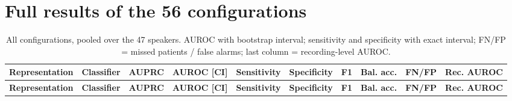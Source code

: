 \documentclass[11pt,a4paper]{article}
\begin{document}
\appendix
\section{Full results of the 56 configurations}\label{sec:app-full}
\begin{landscape}
\begin{center}\footnotesize\renewcommand{\arraystretch}{1.15}
\begin{longtable}{>{\raggedright\arraybackslash}p{3.60cm}>{\raggedright\arraybackslash}p{2.20cm}>{\raggedleft\arraybackslash}p{1.22cm}>{\raggedright\arraybackslash}p{3.30cm}>{\raggedright\arraybackslash}p{2.30cm}>{\raggedright\arraybackslash}p{2.30cm}>{\raggedleft\arraybackslash}p{1.22cm}>{\raggedleft\arraybackslash}p{1.22cm}>{\raggedleft\arraybackslash}p{1.22cm}>{\raggedleft\arraybackslash}p{1.22cm}}
\caption{All configurations, pooled over the 47 speakers. AUROC with bootstrap interval; sensitivity and specificity with exact interval; FN/FP = missed patients / false alarms; last column = recording-level AUROC.}\\
\toprule
\textbf{\hspace{0pt}Representation} & \textbf{\hspace{0pt}Classifier} & \textbf{\hspace{0pt}AUPRC} & \textbf{\hspace{0pt}AUROC [CI]} & \textbf{\hspace{0pt}Sensitivity} & \textbf{\hspace{0pt}Specificity} & \textbf{\hspace{0pt}F1} & \textbf{\hspace{0pt}Bal. acc.} & \textbf{\hspace{0pt}FN/\allowbreak{}FP} & \textbf{\hspace{0pt}Rec. AUROC}\\\midrule\endfirsthead
\toprule
\textbf{\hspace{0pt}Representation} & \textbf{\hspace{0pt}Classifier} & \textbf{\hspace{0pt}AUPRC} & \textbf{\hspace{0pt}AUROC [CI]} & \textbf{\hspace{0pt}Sensitivity} & \textbf{\hspace{0pt}Specificity} & \textbf{\hspace{0pt}F1} & \textbf{\hspace{0pt}Bal. acc.} & \textbf{\hspace{0pt}FN/\allowbreak{}FP} & \textbf{\hspace{0pt}Rec. AUROC}\\\midrule\endhead

\end{longtable}
\end{center}
\end{landscape}
\end{document}
